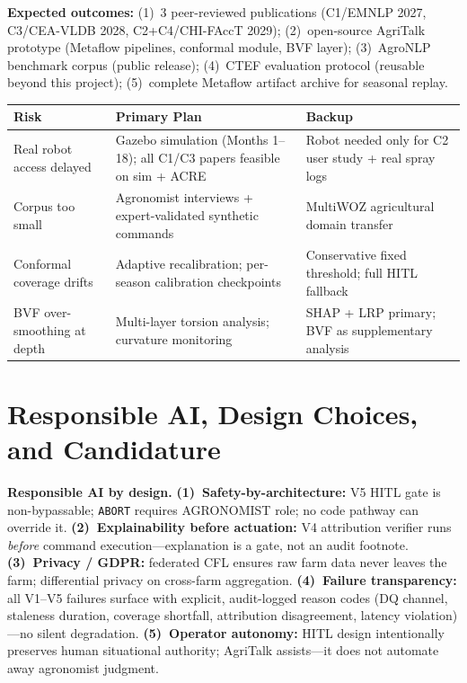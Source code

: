 \documentclass[11pt,a4paper]{article}
\begin{document}
\textbf{Expected outcomes:} (1)~3 peer-reviewed publications (C1/EMNLP 2027, C3/CEA-VLDB 2028, C2+C4/CHI-FAccT 2029); (2)~open-source AgriTalk prototype (Metaflow pipelines, conformal module, BVF layer); (3)~AgroNLP benchmark corpus (public release); (4)~CTEF evaluation protocol (reusable beyond this project); (5)~complete Metaflow artifact archive for seasonal replay.

\begin{center}\small
\begin{tabularx}{\linewidth}{@{}lXX@{}}
\toprule
\textbf{Risk} & \textbf{Primary Plan} & \textbf{Backup} \\
\midrule
Real robot access delayed     & Gazebo simulation (Months 1--18); all C1/C3 papers feasible on sim + ACRE & Robot needed only for C2 user study + real spray logs \\
Corpus too small              & Agronomist interviews + expert-validated synthetic commands & MultiWOZ agricultural domain transfer \\
Conformal coverage drifts     & Adaptive recalibration; per-season calibration checkpoints & Conservative fixed threshold; full HITL fallback \\
BVF over-smoothing at depth   & Multi-layer torsion analysis; curvature monitoring & SHAP + LRP primary; BVF as supplementary analysis \\
\bottomrule
\end{tabularx}
\end{center}

\section{Responsible AI, Design Choices, and Candidature}

\textbf{Responsible AI by design.}
\textbf{(1)~Safety-by-architecture:} V5 HITL gate is non-bypassable; \texttt{ABORT} requires AGRONOMIST role; no code pathway can override it.
\textbf{(2)~Explainability before actuation:} V4 attribution verifier runs \emph{before} command execution---explanation is a gate, not an audit footnote.
\textbf{(3)~Privacy / GDPR:} federated CFL \citep{saha_cfl_2024} ensures raw farm data never leaves the farm; differential privacy on cross-farm aggregation.
\textbf{(4)~Failure transparency:} all V1--V5 failures surface with explicit, audit-logged reason codes (DQ channel, staleness duration, coverage shortfall, attribution disagreement, latency violation)---no silent degradation.
\textbf{(5)~Operator autonomy:} HITL design intentionally preserves human situational authority; AgriTalk assists---it does not automate away agronomist judgment.
\end{document}
